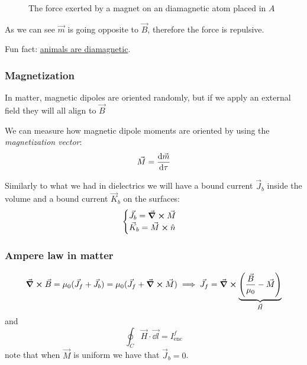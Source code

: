 \documentclass[12pt]{extarticle}
\begin{document}
\begin{figure}[H]
    \centering
    
    \caption{The force exerted by a magnet on an diamagnetic atom placed in $A$}
\end{figure}

As we can see $\vec m$ is going opposite to $\vec B$, therefore the force is repulsive.

Fun fact: \href{https://www.youtube.com/watch?v=KlJsVqc0ywM}{animals are diamagnetic}.

\subsubsection{Magnetization}

In matter, magnetic dipoles are oriented randomly,
but if we apply an external field they will all align to $\vec B$

We can measure how magnetic dipole moments are oriented by using the \emph{magnetization vector}:
\begin{equation}
    \vec M = \dv{\vec m}{\tau}
\end{equation}

Similarly to what we had in dielectrics we will have a bound current $\vec J_b$ inside the volume
and a bound current $\vec K_b$ on the surfaces:
\begin{equation}
    \begin{cases}
        \vec J_b = \curl \vec M \\
        \vec K_b = \vec M \cross \hat n
    \end{cases}
\end{equation}

\subsubsection{Ampere law in matter}
\begin{equation}
    \curl \vec B = \mu_0 (\vec J_f + \vec J_b) = \mu_0 (\vec J_f + \curl \vec M)
    \implies \vec J_f = \curl \underbrace{\left( \frac{\vec B}{\mu_0} - \vec M \right)}_{\vec H}
\end{equation}
and
\begin{equation}
    \oint_C \vec H \cdot \vec{\dd l} = I^f_\text{enc}
\end{equation}
note that when $\vec M$ is uniform we have that $\vec J_b = 0$.
\end{document}
